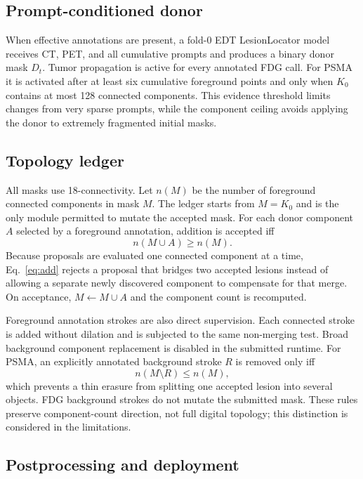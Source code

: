\documentclass[runningheads]{llncs}
\begin{document}
\subsection{Prompt-conditioned donor}

When effective annotations are present, a fold-0 EDT LesionLocator model
receives CT, PET, and all cumulative prompts and produces a binary donor mask
$D_t$. Tumor propagation is active for every annotated FDG call. For PSMA it
is activated after at least six cumulative foreground points and only when
$K_0$ contains at most 128 connected components. This evidence threshold
limits changes from very sparse prompts, while the component ceiling avoids
applying the donor to extremely fragmented initial masks.

\subsection{Topology ledger}

All masks use 18-connectivity. Let $n(M)$ be the number of foreground
connected components in mask $M$. The ledger starts from $M=K_0$ and is the
only module permitted to mutate the accepted mask. For each donor component
$A$ selected by a foreground annotation, addition is accepted iff
\begin{equation}
n(M\cup A) \ge n(M).
\label{eq:add}
\end{equation}
Because proposals are evaluated one connected component at a time,
Eq.~\ref{eq:add} rejects a proposal that bridges two accepted lesions instead
of allowing a separate newly discovered component to compensate for that
merge. On acceptance, $M\leftarrow M\cup A$ and the component count is
recomputed.

Foreground annotation strokes are also direct supervision. Each connected
stroke is added without dilation and is subjected to the same non-merging
test. Broad background component replacement is disabled in the submitted
runtime. For PSMA, an explicitly annotated background stroke $R$ is removed
only iff
\begin{equation}
n(M\setminus R) \le n(M),
\label{eq:remove}
\end{equation}
which prevents a thin erasure from splitting one accepted lesion into several
objects. FDG background strokes do not mutate the submitted mask. These rules
preserve component-count direction, not full digital topology; this distinction
is considered in the limitations.

\subsection{Postprocessing and deployment}
\end{document}
